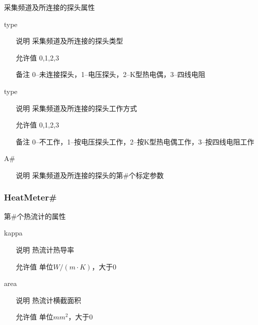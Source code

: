 采集频道及所连接的探头属性

\begin{definition}{type}{}
    \begin{itemize}
        \item[说明] 采集频道及所连接的探头类型
        \item[允许值] 0,1,2,3
        \item[备注] 0--未连接探头，1--电压探头，2--K型热电偶，3--四线电阻 
    \end{itemize}
\end{definition}

\begin{definition}{type}{}
    \begin{itemize}
        \item[说明] 采集频道及所连接的探头工作方式
        \item[允许值] 0,1,2,3
        \item[备注] 0--不工作，1--按电压探头工作，2--按K型热电偶工作，3--按四线电阻工作 
    \end{itemize}
\end{definition}

\begin{definition}{A\#}{}
    \begin{itemize}
        \item[说明] 采集频道及所连接的探头的第\#个标定参数
    \end{itemize}
\end{definition}

\subsubsection*{HeatMeter\#}
第\#个热流计的属性
\begin{definition}{kappa}{}
    \begin{itemize}
        \item[说明] 热流计热导率
        \item[允许值] 单位$W/(m\cdot K)$，大于0
    \end{itemize}
\end{definition}

\begin{definition}{area}{}
    \begin{itemize}
        \item[说明] 热流计横截面积
        \item[允许值] 单位$mm^2$，大于0
    \end{itemize}
\end{definition}
